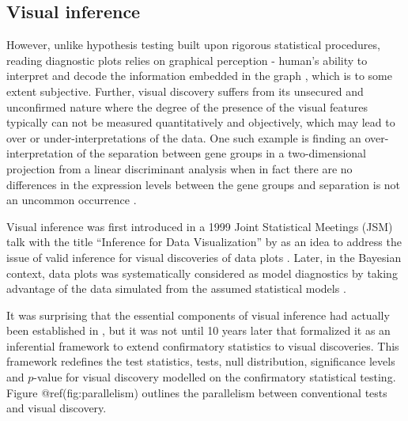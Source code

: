 \documentclass[]{interact}
\theoremstyle{plain}%
\theoremstyle{definition}
\theoremstyle{remark}
\begin{document}
\hypertarget{visual-inference}{%
\subsection{Visual inference}\label{visual-inference}}

However, unlike hypothesis testing built upon rigorous statistical
procedures, reading diagnostic plots relies on graphical perception -
human's ability to interpret and decode the information embedded in the
graph \citep{cleveland_graphical_1984}, which is to some extent
subjective. Further, visual discovery suffers from its unsecured and
unconfirmed nature where the degree of the presence of the visual
features typically can not be measured quantitatively and objectively,
which may lead to over or under-interpretations of the data. One such
example is finding an over-interpretation of the separation between gene
groups in a two-dimensional projection from a linear discriminant
analysis when in fact there are no differences in the expression levels
between the gene groups and separation is not an uncommon occurrence
\citep{roy_chowdhury_using_2015}.

Visual inference was first introduced in a 1999 Joint Statistical
Meetings (JSM) talk with the title ``Inference for Data Visualization''
by \citet{buja_inference_1999} as an idea to address the issue of valid
inference for visual discoveries of data plots
\citep{gelman_exploratory_2004}. Later, in the Bayesian context, data
plots was systematically considered as model diagnostics by taking
advantage of the data simulated from the assumed statistical models
\citep{gelman_bayesian_2003, gelman_exploratory_2004}.

It was surprising that the essential components of visual inference had
actually been established in \citet{buja_inference_1999}, but it was not
until 10 years later that \citet{buja_statistical_2009} formalized it as
an inferential framework to extend confirmatory statistics to visual
discoveries. This framework redefines the test statistics, tests, null
distribution, significance levels and \(p\)-value for visual discovery
modelled on the confirmatory statistical testing. Figure
@ref(fig:parallelism) outlines the parallelism between conventional
tests and visual discovery.
\end{document}
